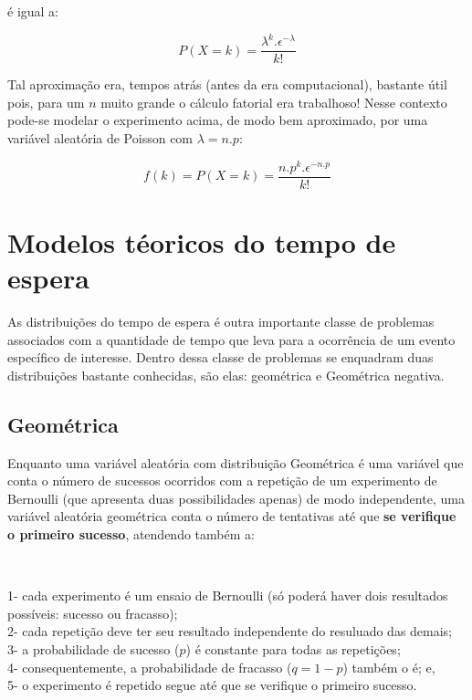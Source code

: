 \documentclass[
]{book}
\begin{document}
\hfill\break

é igual a:

\hfill\break

\[
P(X=k) = \frac{\lambda ^{k}. \epsilon^{-\lambda}} {k!}
\]

\hfill\break

Tal aproximação era, tempos atrás (antes da era computacional), bastante útil pois, para um \(n\) muito grande o cálculo fatorial era trabalhoso! Nesse contexto pode-se modelar o experimento acima, de modo bem aproximado, por uma variável aleatória de Poisson com \(\lambda=n . p\):

\[
f(k) = P(X=k) = \frac{n . p^{k}. \epsilon^{- n . p}} {k!}
\]

\hypertarget{modelos-tuxe9oricos-do-tempo-de-espera}{%
\section{Modelos téoricos do tempo de espera}\label{modelos-tuxe9oricos-do-tempo-de-espera}}

As distribuições do tempo de espera é outra importante classe de problemas associados com a quantidade de tempo que leva para a ocorrência de um evento específico de interesse. Dentro dessa classe de problemas se enquadram duas distribuições bastante conhecidas, são elas: geométrica e Geométrica negativa.

\hypertarget{geomuxe9trica}{%
\subsection{Geométrica}\label{geomuxe9trica}}

Enquanto uma variável aleatória com distribuição Geométrica é uma variável que conta o número de sucessos ocorridos com a repetição de um experimento de Bernoulli (que apresenta duas possibilidades apenas) de modo independente, uma variável aleatória geométrica conta o número de tentativas até que \textbf{se verifique o primeiro sucesso}, atendendo também a:

~

1- cada experimento é um ensaio de Bernoulli (só poderá haver dois resultados possíveis: sucesso ou fracasso);\\
2- cada repetição deve ter seu resultado independente do resuluado das demais;\\
3- a probabilidade de sucesso (\(p\)) é constante para todas as repetições;\\
4- consequentemente, a probabilidade de fracasso (\(q=1-p\)) também o é; e,\\
5- o experimento é repetido segue até que se verifique o primeiro sucesso.
\end{document}
